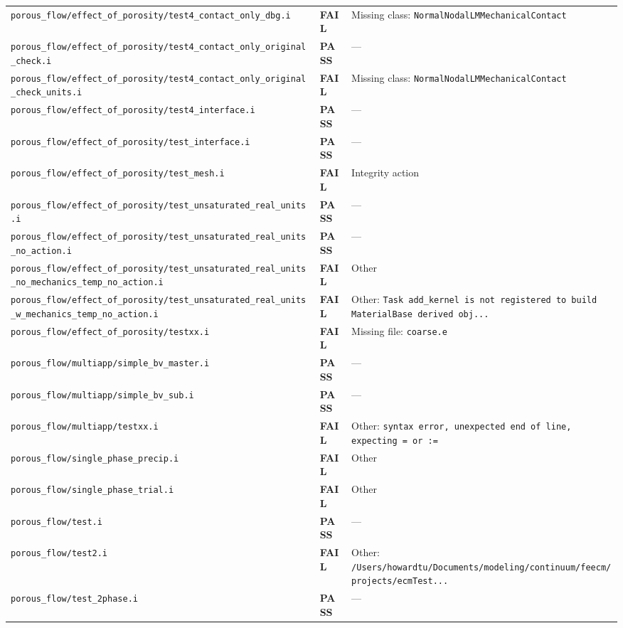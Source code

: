 \documentclass[10pt,letterpaper]{article}
\newcommand{\PASS}{\textcolor{passgreen}{\textbf{PASS}}}
\newcommand{\FAIL}{\textcolor{failred}{\textbf{FAIL}}}
\newcommand{\code}[1]{\texttt{\small #1}}
\begin{document}
\begin{longtable}{p{} l p{}}
\code{porous\_flow/effect\_of\_porosity/test4\_contact\_only\_dbg.i} & \FAIL & Missing class: \code{NormalNodalLMMechanicalContact} \\
\code{porous\_flow/effect\_of\_porosity/test4\_contact\_only\_original\_check.i} & \PASS & --- \\
\code{porous\_flow/effect\_of\_porosity/test4\_contact\_only\_original\_check\_units.i} & \FAIL & Missing class: \code{NormalNodalLMMechanicalContact} \\
\code{porous\_flow/effect\_of\_porosity/test4\_interface.i} & \PASS & --- \\
\code{porous\_flow/effect\_of\_porosity/test\_interface.i} & \PASS & --- \\
\code{porous\_flow/effect\_of\_porosity/test\_mesh.i} & \FAIL & Integrity action \\
\code{porous\_flow/effect\_of\_porosity/test\_unsaturated\_real\_units.i} & \PASS & --- \\
\code{porous\_flow/effect\_of\_porosity/test\_unsaturated\_real\_units\_no\_action.i} & \PASS & --- \\
\code{porous\_flow/effect\_of\_porosity/test\_unsaturated\_real\_units\_no\_mechanics\_temp\_no\_action.i} & \FAIL & Other \\
\code{porous\_flow/effect\_of\_porosity/test\_unsaturated\_real\_units\_w\_mechanics\_temp\_no\_action.i} & \FAIL & Other: \code{Task add\_kernel is not registered to build MaterialBase derived obj...} \\
\code{porous\_flow/effect\_of\_porosity/testxx.i} & \FAIL & Missing file: \code{coarse.e} \\
\code{porous\_flow/multiapp/simple\_bv\_master.i} & \PASS & --- \\
\code{porous\_flow/multiapp/simple\_bv\_sub.i} & \PASS & --- \\
\code{porous\_flow/multiapp/testxx.i} & \FAIL & Other: \code{syntax error, unexpected end of line, expecting = or :=} \\
\code{porous\_flow/single\_phase\_precip.i} & \FAIL & Other \\
\code{porous\_flow/single\_phase\_trial.i} & \FAIL & Other \\
\code{porous\_flow/test.i} & \PASS & --- \\
\code{porous\_flow/test2.i} & \FAIL & Other: \code{/Users/howardtu/Documents/modeling/continuum/feecm/projects/ecmTest...} \\
\code{porous\_flow/test\_2phase.i} & \PASS & --- \\

\end{longtable}
\end{document}
